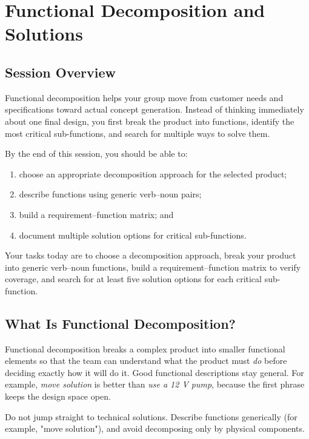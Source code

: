 \chapter{Functional Decomposition and Solutions}
\label{sec:functional_decomposition_solution}
\section{Session Overview}

Functional decomposition helps your group move from customer needs and specifications toward actual concept generation. Instead of thinking immediately about one final design, you first break the product into functions, identify the most critical sub-functions, and search for multiple ways to solve them.

By the end of this session, you should be able to:
\begin{enumerate}
    \item choose an appropriate decomposition approach for the selected product;
    \item describe functions using generic verb--noun pairs;
    \item build a requirement--function matrix; and
    \item document multiple solution options for critical sub-functions.
\end{enumerate}

\begin{tcolorbox}[title=Goal]
Your tasks today are to choose a decomposition approach, break your product into generic verb--noun functions, build a requirement--function matrix to verify coverage, and search for at least five solution options for each critical sub-function.
\end{tcolorbox}

\section{What Is Functional Decomposition?}

Functional decomposition breaks a complex product into smaller functional elements so that the team can understand what the product must \emph{do} before deciding exactly how it will do it. Good functional descriptions stay general. For example, \textit{move solution} is better than \textit{use a 12 V pump}, because the first phrase keeps the design space open.

\begin{tcolorbox}[title=Common Mistakes]
Do not jump straight to technical solutions. Describe functions generically (for example, "move solution"), and avoid decomposing only by physical components.
\end{tcolorbox}

